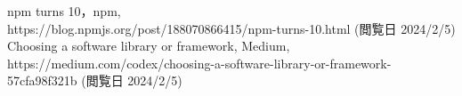 \documentclass[main]{subfiles}
\begin{document}
\begin{thebibliography}{9}\setlength{\itemsep}{-2pt}
 npm turns 10，npm, \\https://blog.npmjs.org/post/188070866415/npm-turns-10.html (閲覧日 2024/2/5) 
 Choosing a software library or framework, Medium,\\ https://medium.com/codex/choosing-a-software-library-or-framework-57cfa98f321b (閲覧日 2024/2/5) 
\end{thebibliography}
\end{document}
